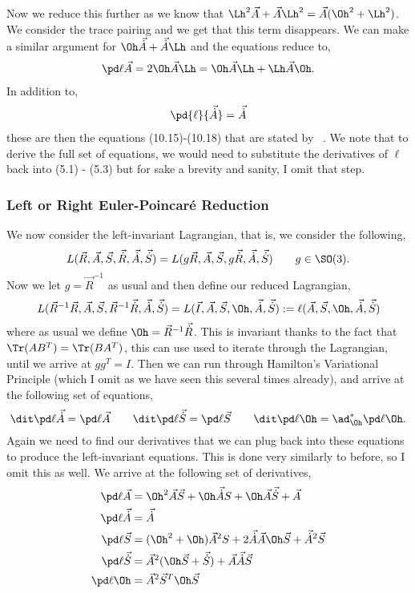 Now we reduce this further as we know that $\Lh^2\vec A + \vec A\Lh^2 = \vec A(\Oh^2 + \Lh^2)$. We consider the trace pairing and we get that this term disappears. We can make a similar argument for $\Oh\vec{\dot A} + \vec{\dot A}\Lh$ and the equations reduce to,
\begin{align}
  \pd \ell {\vec A} = 2\Oh \vec A\Lh = \Oh\vec A\Lh + \Lh\vec A\Oh.
\end{align}
In addition to,
\begin{align}
  \pd{\ell}{\vec{\dot A}} = \vec{\dot A}
\end{align}
these are then the equations (10.15)-(10.18) that are stated by ~\cite{holm_schmah_stoica_2009}. We note that to derive the full set of equations, we would need to substitute the derivatives of $\ell$ back into (5.1) - (5.3) but for sake a brevity and sanity, I omit that step.\\

\noindent
\subsubsection{Left or Right Euler-Poincar\'e Reduction}

We now consider the left-invariant Lagrangian, that is, we consider the following,
$$ L(\vec R, \vec A, \vec S, \vec{\dot R}, \vec{\dot A}, \vec{\dot S}) = L(g\vec R, \vec A, \vec S, g\vec{\dot R}, \vec{\dot A}, \vec{\dot S}) \qquad g \in \SO(3). $$
Now we let $g = \vec R^{-1}$ as usual and then define our reduced Lagrangian,
$$ L(\vec R^{-1}\vec R, \vec A, \vec S, \vec R^{-1}\vec{\dot R}, \vec{\dot A}, \vec{\dot S}) = L(\vec I, \vec A, \vec S, \Oh, \vec{\dot A}, \vec{\dot S}) := \ell(\vec A, \vec S, \Oh, \vec{\dot A}, \vec{\dot S})$$
where as usual we define $\Oh = \vec R^{-1}\vec{\dot R}$. This is invariant thanks to the fact that $\Tr(AB^T) = \Tr(BA^T)$, this can use used to iterate through the Lagrangian, until we arrive at $gg^T = I$. Then we can run through Hamilton's Variational Principle (which I omit as we have seen this several times already), and arrive at the following set of equations,
$$ \dit \pd \ell {\vec{\dot A}} = \pd \ell {\vec A} \qquad \dit \pd \ell {\vec{\dot S}} = \pd \ell {\vec S} \qquad \dit \pd \ell \Oh = \ad_{\Oh}^* \pd \ell \Oh. $$
Again we need to find our derivatives that we can plug back into these equations to produce the left-invariant equations. This is done very similarly to before, so I omit this as well. We arrive at the following set of derivatives,
\begin{align*}
  \pd \ell {\vec A} &= \Oh^2 \vec A\vec S + \Oh \vec {\dot A}S + \Oh \vec A\vec {\dot S} + \vec A \\
  \pd \ell {\vec {\dot A}} &= \vec {\dot A} \\
  \pd \ell {\vec S} &= (\Oh^2 + \Oh)\vec A^2S + 2\vec {\dot A}\vec A \Oh \vec S + \vec {\dot A}^2 \vec S\\
  \pd \ell {\vec {\dot S}} &= \vec A^2(\Oh\vec S + \vec {\dot S}) + \vec A \vec {\dot A}\vec S \\
  \pd \ell \Oh &= \vec A^2 \vec S^T \Oh \vec S
\end{align*}


